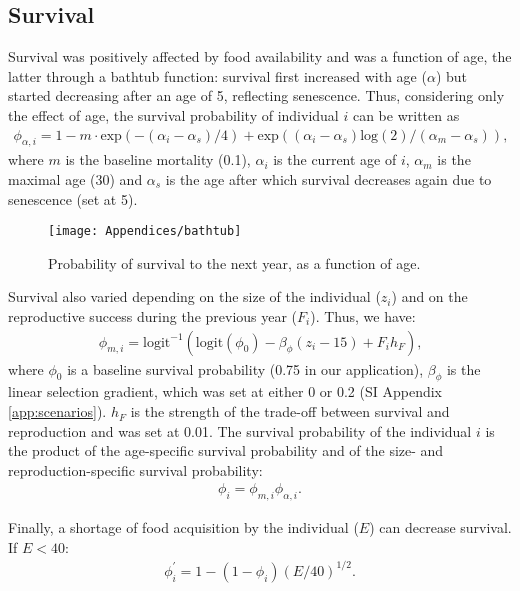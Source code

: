 \subsection{Survival} \label{app:simul:surv}
Survival was positively affected by food availability and was a function of age, the latter through a bathtub function: survival first increased with age ($\alpha$) but started decreasing after an age of 5, reflecting senescence.
Thus, considering only the effect of age, the survival probability of individual $i$ can be written as
\begin{align}
\phi_{\alpha,i} = 1 - m \cdot \mathrm{exp}(-(\alpha_i-\alpha_s)/4) + \mathrm{exp}((\alpha_i-\alpha_s)\mathrm{log}(2)/(\alpha_m-\alpha_s)) \text{,}
\end{align}
where $m$ is the baseline mortality (0.1), $\alpha_i$ is the current age of $i$, $\alpha_m$ is the maximal age (30) and $\alpha_s$ is the age after which survival decreases again due to senescence (set at 5).
\begin{figure}[ht]
	\texttt{[image: Appendices/bathtub]}
  \caption{Probability of survival to the next year, as a function of age.}
   \label{bathtub}
\end{figure}
Survival also varied depending on the size of the individual ($z_i$) and on the reproductive success during the previous year ($F_i$). Thus, we have:
\begin{align}
\phi_{m,i} = \mathrm{logit}^{-1}(\mathrm{logit}(\phi_0) - \beta_{\phi}(z_i-15)   + F_i h_F) \text{,}
\end{align}
where $\phi_0$ is a baseline survival probability (0.75 in our application), $\beta_{\phi}$ is the linear selection gradient, which was set at either 0 or 0.2 (SI Appendix \ref{app:scenarios}). $h_F$ is the strength of the trade-off between survival and reproduction and was set at 0.01. The survival probability of the individual $i$ is the product of the age-specific survival probability and of the size- and reproduction-specific survival probability:
\begin{align}
\phi_{i} = \phi_{m,i}\phi_{\alpha,i}\text{.}
\end{align}


Finally, a shortage of food acquisition by the individual ($E$) can decrease survival. If $E<40$:
\begin{align}
	\phi_i^{\prime}= 1 - (1-\phi_{i})(E/40)^{1/2}\text{.}
\end{align}

